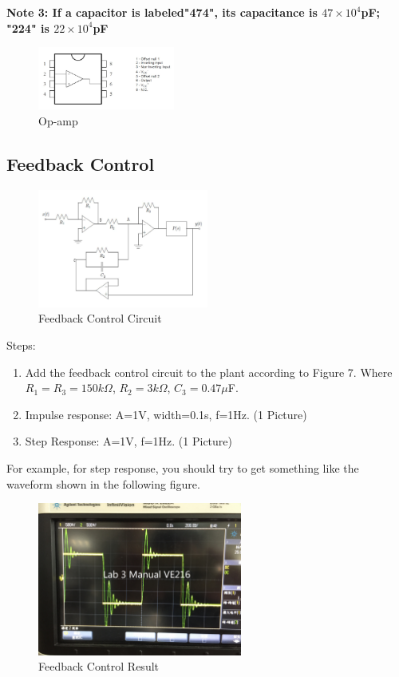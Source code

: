 \documentclass[a4paper]{article}
\begin{document}
\textbf{Note 3: If a capacitor is labeled"474", its capacitance is $47\times10^4$pF; "224" is $22\times10^4$pF}
\begin{figure}[H]
    \begin{center}
        \includegraphics[width=0.4\textwidth]{6.jpg}
    \end{center}
    \caption{Op-amp}
\end{figure}
\subsection{Feedback Control}
\begin{figure}[H]
    \begin{center}
        \includegraphics[width=0.5\textwidth]{7.jpg}
    \end{center}
    \caption{Feedback Control Circuit}
\end{figure}
Steps:
\begin{enumerate}
    \item Add the feedback control circuit to the plant according to Figure 7. Where $R_1=R_3=150k\Omega$, $R_2=3k\Omega$, $C_3=0.47\mu$F.
    \item Impulse response: A=1V, width=0.1s, f=1Hz. (1 Picture)
    \item Step Response: A=1V, f=1Hz. (1 Picture)
\end{enumerate}
For example, for step response, you should try to get something like the waveform shown in the following figure.
\begin{figure}[H]
    \begin{center}
        \includegraphics[width=0.6\textwidth]{8.jpg}
    \end{center}
    \caption{Feedback Control Result}
\end{figure}
\end{document}
